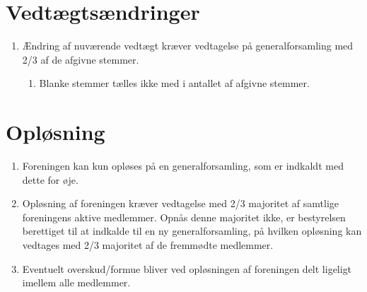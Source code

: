 \documentclass[a4paper, 10pt]{article}
\renewcommand\thesection{\textsection\arabic{section}}
\newenvironment{stykenum}{
  \begin{enumerate}[%
    label=Stk.~\arabic*:, ref=\textsection~\theenumi~Stk.~\arabic*, start=1]
}{\end{enumerate}}
\newenvironment{substykenum}{
  \begin{enumerate}[%
          label=Stk.~\arabic{enumi}.\arabic*:,
      ref=\thesection~Stk.~\arabic{enumi}.\arabic*, start=1]
}{\end{enumerate}}
\begin{document}
\section{Vedtægtsændringer}
\begin{stykenum}
    \item Ændring af nuværende vedtægt kræver vedtagelse på generalforsamling
        med 2/3 af de afgivne stemmer.
    \begin{substykenum}
        \item Blanke stemmer tælles ikke med i antallet af afgivne stemmer.
    \end{substykenum}
\end{stykenum}

\section{Opløsning}
\begin{stykenum}
    \item Foreningen kan kun opløses på en generalforsamling, som er indkaldt
        med dette for øje.

    \item Opløsning af foreningen kræver vedtagelse med 2/3 majoritet af
        samtlige foreningens aktive medlemmer. Opnås denne majoritet ikke, er
        bestyrelsen berettiget til at indkalde til en ny generalforsamling, på
        hvilken opløsning kan vedtages med 2/3 majoritet af de fremmødte
        medlemmer.

    \item Eventuelt overskud/formue bliver ved opløsningen af foreningen delt
        ligeligt imellem alle medlemmer.
\end{stykenum}
\end{document}
